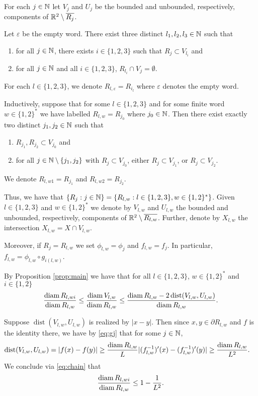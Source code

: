 \documentclass{amsart}
\DeclareMathOperator{\dist}{dist}
\begin{document}
For each $j\in \mathbb{N}$ let $V_j$ and $U_j$ be the bounded and unbounded, respectively, components of $\mathbb{R}^2 \setminus \overline{R_j}$. 

 Let $\varepsilon$ be the empty word. There exist three distinct $l_1,l_2,l_3 \in \mathbb{N}$ such that 
\begin{enumerate}
\item for all $j\in \mathbb{N}$, there exists $i\in\{1,2,3\}$ such that $R_j \subset V_{l_i}$ and
\item for all $j\in\mathbb{N}$ and all $i\in\{1,2,3\}$, $R_{l_i} \cap V_j = \emptyset$.
\end{enumerate}
For each $l\in\{1,2,3\}$, we denote $R_{l,\varepsilon}= R_{i_l}$ where $\varepsilon$ denotes the empty word. 

Inductively, suppose that for some $l\in\{1,2,3\}$ and for some finite word $w\in\{1,2\}^*$ we have labelled $R_{l,w} = R_{j_0}$ where $j_0 \in \mathbb{N}$. Then there exist exactly two distinct $j_1,j_2 \in \mathbb{N}$ such that
\begin{enumerate}
\item $R_{j_1},R_{j_2} \subset V_{j_0}$ and
\item for all $j\in\mathbb{N}\setminus \{j_1,j_2\}$ with $R_j \subset V_{j_0}$, either $R_j \subset V_{j_1}$, or $R_j \subset V_{j_2}$. 
\end{enumerate}
We denote $R_{l,w1}=R_{j_1}$ and $R_{l,w2} = R_{j_2}$.

Thus, we have that $\{R_j:j\in\mathbb{N}\} = \{R_{l,w} : l\in\{1,2,3\}, w\in\{1,2\}^*\}$. Given $ l\in\{1,2,3\}$ and $w\in\{1,2\}^*$ we denote by $V_{l,w}$ and $U_{l,w}$ the bounded and unbounded, respectively, components of $\mathbb{R}^2 \setminus \overline{R_{l,w}}$.
Further, denote by $X_{l,w}$ the intersection $X_{l,w} = X \cap V_{l,w}$.  

Moreover, if $R_j = R_{l,w}$ we set $\phi_{l,w} = \phi_j$ and $f_{l,w} = f_{j}$. In particular, $f_{l,w} = \phi_{l,w} \circ g_{i(l,w)}$.



By Proposition \ref{prop:main} we have that for all $ l\in\{1,2,3\}$, $w\in\{1,2\}^*$ and $i\in\{1,2\}$
\begin{equation}
\label{eq:chain} 
\frac{\diam{R_{l,wi}}}{\diam{R_{l,w}}} \leq \frac{\diam{V_{l,w}}}{\diam{R_{l,w}}} \leq \frac{\diam{R_{l,w}}-2\dist(V_{l,w},U_{l,w})}{\diam{R_{l,w}}} .
\end{equation}

Suppose $\dist ( V_{l,w},U_{l,w})$ is realized by $|x-y|$. Then since $x,y \in \partial R_{l,w}$ and $f$ is the identity there, we have by \eqref{eq:gj} that for some $j\in \mathbb{N}$,
\begin{align}\label{eq:ratio}
\dist(V_{l,w},U_{l,w}) &= |f(x) - f(y)| \geq \frac{ \diam {R_{l,w}} }{L} |(f_{l,w}^{-1})'(x)-(f_{l,w}^{-1})'(y)| \geq  \frac{ \diam{R_{l,w}}}{L^2}.
\end{align}
We conclude via \eqref{eq:chain} that 
\begin{equation}
\label{eq:shrink} 
\frac{\operatorname{diam}{R_{l,wi}}}{\operatorname{diam}{R_{l,w}}}\leq 1 - \frac{1}{L^2} .
\end{equation}
\end{document}
